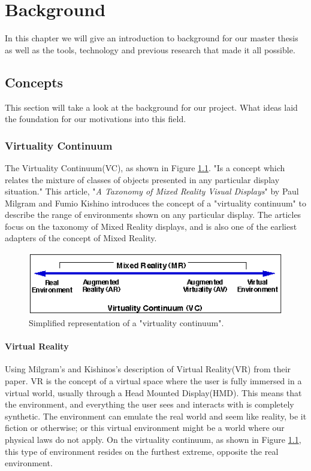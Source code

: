 \chapter{Background}
\label{chap:background}
In this chapter we will give an introduction to background for our master thesis as well as the tools, technology and previous research that made it all possible. 

\section{Concepts}
    This section will take a look at the background for our project. What ideas laid the foundation for our motivations into this field.
    
    \subsection{Virtuality Continuum}
    The Virtuality Continuum(VC), as shown in Figure \ref{fig:virtualcontinuum}. "Is a concept which relates the mixture of classes of objects presented in any particular display situation."\cite{Milgram1994} This article, "\emph{A Taxonomy of Mixed Reality Visual Displays}" by Paul Milgram and Fumio Kishino\cite{Milgram1994} introduces the concept of a "virtuality continuum" to describe the range of environments shown on any particular display. The articles focus on the taxonomy of Mixed Reality displays, and is also one of the earliest adapters of the concept of Mixed Reality.
    \begin{figure}[!ht]
        \centering
        \includegraphics[scale=1]{figures/virtualcontinuum.png}
        \caption{Simplified representation of a "virtuality continuum".\cite{Milgram1994}}
        \label{fig:virtualcontinuum}
    \end{figure}
    
    \subsubsection{Virtual Reality}
    Using Milgram's and Kishinos's description of Virtual Reality(VR) from their paper.\cite{Milgram1994} VR is the concept of a virtual space where the user is fully immersed in a virtual world, usually through a Head Mounted Display(HMD). This means that the environment, and everything the user sees and interacts with is completely synthetic. The environment can emulate the real world and seem like reality, be it fiction or otherwise; or this virtual environment might be a world where our physical laws do not apply. On the virtuality continuum, as shown in Figure \ref{fig:virtualcontinuum}, this type of environment resides on the furthest extreme, opposite the real environment.

